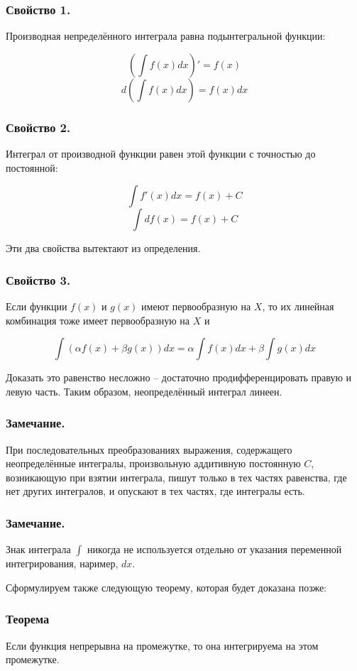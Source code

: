 \subsubsection{Свойство 1.}
Производная непределённого интеграла равна подынтегральной функции:

$$\left(\int f(x) dx \right)'=f(x)$$
$$d\left(\int f(x) dx \right)=f(x)dx$$

\subsubsection{Свойство 2.}
Интеграл от производной функции равен этой функции с точностью до постоянной:

$$\int f'(x)dx=f(x)+C$$
$$\int df(x)=f(x)+C$$

Эти два свойства вытектают из определения.

\subsubsection{Свойство 3.}
Если функции $f(x)$ и  $g(x)$ имеют первообразную на $X$, то их линейная комбинация тоже имеет первообразную на $X$ и 

$$\int(\alpha f(x) + \beta g(x))dx=\alpha \int f(x)dx+ \beta \int g(x)dx$$

Доказать это равенство несложно -- достаточно продифференцировать правую и левую часть.
Таким образом, неопределённый интеграл линеен.

\subsubsection{Замечание.}

При последовательных преобразованиях выражения, содержащего неопределённые интегралы, произвольную аддитивную постоянную $C$, возникающую при взятии интеграла, пишут только в тех частях равенства, где нет других интегралов, и опускают в тех частях, где интегралы есть.

\subsubsection{Замечание.}

Знак интеграла $\int$ никогда не используется отдельно от указания переменной интегрирования, наример, $dx$.

Сформулируем также следующую теорему, которая будет доказана позже:

\subsubsection{Теорема}

Если функция непрерывна на промежутке, то она интегрируема на этом промежутке.
